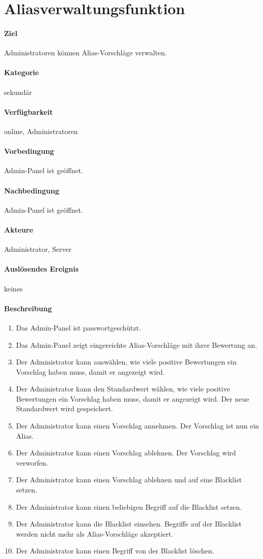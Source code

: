 \section{Aliasverwaltungsfunktion}
\label{Aliasverwaltungsfunktion}
\paragraph{Ziel}
Administratoren können Alias-Vorschläge verwalten.
\paragraph{Kategorie}
sekundär
\paragraph{Verfügbarkeit}
online, Administratoren
\paragraph{Vorbedingung}
Admin-Panel ist geöffnet.
\paragraph{Nachbedingung}
Admin-Panel ist geöffnet.
\paragraph{Akteure}
Administrator, Server
\paragraph{Auslösendes Ereignis}
keines
\paragraph{Beschreibung}
\begin{enumerate}
    \item Das Admin-Panel ist passwortgeschützt.
    \item Das Admin-Panel zeigt eingereichte Alias-Vorschläge mit ihrer Bewertung an.
    \item Der Administrator kann auswählen, wie viele positive Bewertungen ein Vorschlag haben muss, damit er angezeigt wird.
    \item Der Administrator kann den Standardwert wählen, wie viele positive Bewertungen ein Vorschlag haben muss, damit er angezeigt wird. Der neue Standardwert wird gespeichert.
    \item Der Administrator kann einen Vorschlag annehmen. Der Vorschlag ist nun ein Alias.
    \item Der Administrator kann einen Vorschlag ablehnen. Der Vorschlag wird verworfen.
    \item Der Administrator kann einen Vorschlag ablehnen und auf eine Blacklist setzen.
    \item Der Administrator kann einen beliebigen Begriff auf die Blacklist setzen.
    \item Der Administrator kann die Blacklist einsehen. Begriffe auf der Blacklist werden nicht mehr als Alias-Vorschläge akzeptiert.
    \item Der Administrator kann einen Begriff von der Blacklist löschen.
\end{enumerate}